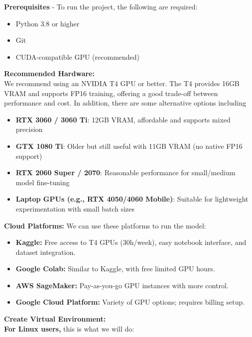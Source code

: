 \textbf{Prerequisites} - To run the project, the following are required:
\begin{itemize}
\item Python 3.8 or higher
\item Git
\item CUDA-compatible GPU (recommended)
\end{itemize}

\textbf{Recommended Hardware:}\\
We recommend using an NVIDIA T4 GPU or better. The T4 provides 16GB VRAM and supports FP16 training, offering a good trade-off between performance and cost. In addition, there are some alternative options including
\begin{itemize}
\item \textbf{RTX 3060 / 3060 Ti}: 12GB VRAM, affordable and supports mixed precision
\item \textbf{GTX 1080 Ti}: Older but still useful with 11GB VRAM (no native FP16 support)
\item \textbf{RTX 2060 Super / 2070}: Reasonable performance for small/medium model fine-tuning
\item \textbf{Laptop GPUs (e.g., RTX 4050/4060 Mobile)}: Suitable for lightweight experimentation with small batch sizes
\end{itemize}
\textbf{Cloud Platforms:}
We can use these platforms to run the model:
\begin{itemize}
\item \textbf{Kaggle:} Free access to T4 GPUs (30h/week), easy notebook interface, and dataset integration.
\item \textbf{Google Colab:} Similar to Kaggle, with free limited GPU hours.
\item \textbf{AWS SageMaker:} Pay-as-you-go GPU instances with more control.
\item \textbf{Google Cloud Platform:} Variety of GPU options; requires billing setup.
\end{itemize}

\textbf{Create Virtual Environment:}\\
\textbf{For Linux users,} this is what we will do:

